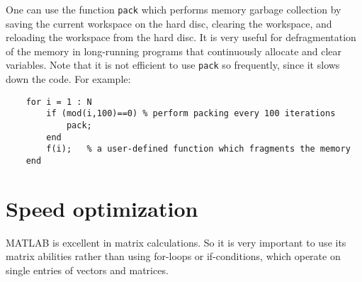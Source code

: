 \documentclass[10pt,a4paper]{article}
\newcounter{example}[section]
\begin{document}
%    
One can use the function \texttt{pack} which performs memory garbage collection by saving the current workspace on the hard disc, clearing the workspace, and reloading the workspace from the hard disc. It is very useful for defragmentation of the memory in long-running programs that continuously allocate and clear variables. Note that it is not efficient to use \texttt{pack} so frequently, since it slows down the code. For example:
\begin{lstlisting}
	for i = 1 : N
		if (mod(i,100)==0) % perform packing every 100 iterations
			pack;
		end
		f(i);	% a user-defined function which fragments the memory
	end
\end{lstlisting}
\section{Speed optimization}
\label{sec:speed}
MATLAB is excellent in matrix calculations. So it is very important to use its matrix abilities rather than using for-loops or if-conditions, which operate on single entries of vectors and matrices.
\end{document}
